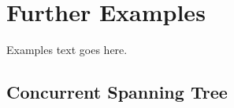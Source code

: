 \section{Further Examples}\label{sec:examples}
Examples text goes here.
\subsection{Concurrent Spanning Tree}